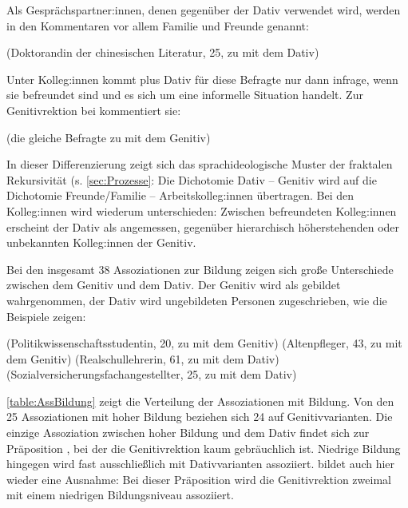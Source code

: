 Als Gesprächspartner:innen, denen gegenüber der Dativ verwendet wird, werden in den Kommentaren vor allem Familie und Freunde genannt: 
\begin{exe}
\ex {} (Doktorandin der chinesischen Literatur, 25, zu \dank{} mit dem Dativ)
\end{exe}
Unter Kolleg:innen kommt \dank{} plus Dativ für diese Befragte nur dann infrage, wenn sie befreundet sind und es sich um eine informelle Situation handelt. 
Zur Genitivrektion bei \dank{} kommentiert sie: 
\begin{exe}
\ex {} (die gleiche Befragte zu \dank{} mit dem Genitiv)
\end{exe}
In dieser Differenzierung zeigt sich das sprachideologische Muster der fraktalen Rekursivität (s. \autoref{sec:Prozesse}: 
Die Dichotomie Dativ -- Genitiv wird auf die Dichotomie Freunde\slash Familie -- Arbeitskolleg:innen übertragen. 
Bei den Kolleg:innen wird wiederum unterschieden: 
Zwischen befreundeten Kolleg:innen erscheint der Dativ als angemessen, gegenüber hierarchisch höherstehenden oder unbekannten Kolleg:innen der Genitiv. 


Bei den insgesamt 38 Assoziationen zur Bildung zeigen sich große Unterschiede zwischen dem Genitiv und dem Dativ. 
Der Genitiv wird als gebildet wahrgenommen, der Dativ wird ungebildeten Personen zugeschrieben, wie die Beispiele zeigen: 
\begin{exe}
\ex {} (Politikwissenschaftsstudentin, 20, zu \waehrend{} mit dem Genitiv)
\ex {} (Altenpfleger, 43, zu \wegen{} mit dem Genitiv)
\ex {} (Realschullehrerin, 61, zu \waehrend{} mit dem Dativ)
\ex {} (Sozialversicherungsfachangestellter, 25, zu \wegen{} mit dem Dativ) 
\end{exe}
\autoref{table:AssBildung} zeigt die Verteilung der Assoziationen mit Bildung.
Von den 25 Assoziationen mit hoher Bildung beziehen sich 24 auf Genitivvarianten. 
Die einzige Assoziation zwischen hoher Bildung und dem Dativ findet sich zur Präposition \gegenueber, bei der die Genitivrektion kaum gebräuchlich ist. 
Niedrige Bildung hingegen wird fast ausschließlich mit Dativvarianten assoziiert.
 bildet auch hier wieder eine Ausnahme: Bei dieser Präposition wird die Genitivrektion zweimal mit einem niedrigen Bildungsniveau assoziiert. 

